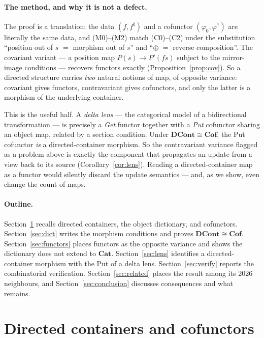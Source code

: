 \documentclass[11pt,a4paper]{amsart}
\newcommand{\Cat}{\mathbf{Cat}}
\newcommand{\Cof}{\mathbf{Cof}}
\newcommand{\DCont}{\mathbf{DCont}}
\theoremstyle{plain}
\theoremstyle{definition}
\theoremstyle{remark}
\begin{document}
\paragraph{The method, and why it is not a defect.} The proof is a translation: the
data $(f,f^\sharp)$ and a cofunctor $(\varphi_0,\varphi^\uparrow)$ are literally the same
data, and (M0)--(M2) match (C0)--(C2) under the substitution
``position out of $s$ $=$ morphism out of $s$'' and ``$\oplus$ $=$ reverse
composition''. The covariant variant --- a position map $P(s)\to P'(fs)$ subject to the
mirror-image conditions --- recovers functors exactly (Proposition~\ref{prop:cov}). So a
directed structure carries \emph{two} natural notions of map, of opposite variance:
covariant gives functors, contravariant gives cofunctors, and only the latter is a
morphism of the underlying container.

This is the useful half. A \emph{delta lens} \cite{JR13,Clarke20,Clarke22} --- the
categorical model of a bidirectional transformation --- is precisely a \emph{Get}
functor together with a \emph{Put} cofunctor sharing an object map, related by a section
condition. Under $\DCont\cong\Cof$, the Put cofunctor \emph{is} a directed-container
morphism. So the contravariant variance flagged as a problem above is exactly the
component that propagates an update from a view back to its source
(Corollary~\ref{cor:lens}). Reading a directed-container map as a functor would silently
discard the update semantics --- and, as we show, even change the count of maps.

\paragraph{Outline.} Section~\ref{sec:prelim} recalls directed containers, the object
dictionary, and cofunctors. Section~\ref{sec:dict} writes the morphism conditions and
proves $\DCont\cong\Cof$. Section~\ref{sec:functors} places functors as the opposite
variance and shows the dictionary does not extend to $\Cat$. Section~\ref{sec:lens}
identifies a directed-container morphism with the Put of a delta lens.
Section~\ref{sec:verify} reports the combinatorial verification.
Section~\ref{sec:related} places the result among its 2026 neighbours, and
Section~\ref{sec:conclusion} discusses consequences and what remains.

\section{Directed containers and cofunctors}\label{sec:prelim}
\end{document}

